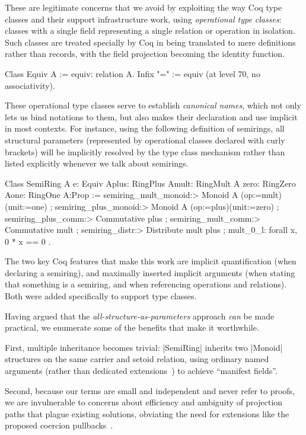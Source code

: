 \documentclass{llncs}
\begin{document}
These are legitimate concerns that we avoid by exploiting the way Coq type classes and their support infrastructure work, using \emph{operational type classes}: classes with a single field representing a single relation or operation in isolation. Such classes are treated specially by Coq in being translated to mere definitions rather than records, with the field projection becoming the identity function.
\begin{code}
 Class Equiv A := equiv: relation A.
 Infix "=" := equiv (at level 70, no associativity).
\end{code}
These operational type classes serve to establish \emph{canonical names}, which not only lets us bind notations to them, but also makes their declaration and use implicit in most contexts. For instance, using the following definition of semirings, all structural parameters (represented by operational classes declared with curly brackets) will be implicitly resolved by the type class mechanism rather than listed explicitly whenever we talk about semirings.
\begin{code}
Class SemiRing A {e: Equiv A}{plus: RingPlus A}{mult: RingMult A}
                 {zero: RingZero A}{one: RingOne A}:Prop :=
  { semiring_mult_monoid:> Monoid A (op:=mult)(unit:=one)
  ; semiring_plus_monoid:> Monoid A (op:=plus)(unit:=zero)
  ; semiring_plus_comm:> Commutative plus
  ; semiring_mult_comm:> Commutative mult
  ; semiring_distr:> Distribute mult plus
  ; mult_0_l: forall x, 0 * x == 0 }.
\end{code}
The two key Coq features that make this work are implicit quantification (when declaring a semiring), and maximally inserted implicit arguments (when stating that something is a semiring, and when referencing operations and relations). Both were added specifically to support type classes.

Having argued that the \emph{all-structure-as-parameters} approach \emph{can} be made practical, we enumerate some of the benefits that make it worthwhile.

First, multiple inheritance becomes trivial: |SemiRing| inherits two |Monoid| structures on the same carrier and setoid relation, using ordinary named arguments (rather than dedicated extensions~\cite{DBLP:conf/types/Luo08}) to achieve ``manifest fields''.

Second, because our terms are small and independent and never refer to proofs, we are invulnerable to concerns about efficiency and ambiguity of projection paths that plague existing solutions, obviating the need for extensions like the proposed coercion pullbacks~\cite{Hints}.
\end{document}
